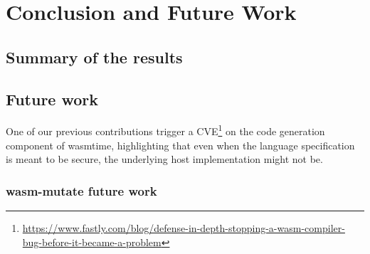 \chapter{Conclusion and Future Work}
\label{chapter:conclude}

\section{Summary of the results}


\section{Future work}
\label{future_work}

One of our previous contributions trigger a CVE\footnote{\url{https://www.fastly.com/blog/defense-in-depth-stopping-a-wasm-compiler-bug-before-it-became-a-problem}} on the code generation component of wasmtime, highlighting that even when the language specification is meant to be secure, the underlying host implementation might not be. 


\subsection{wasm-mutate future work}


